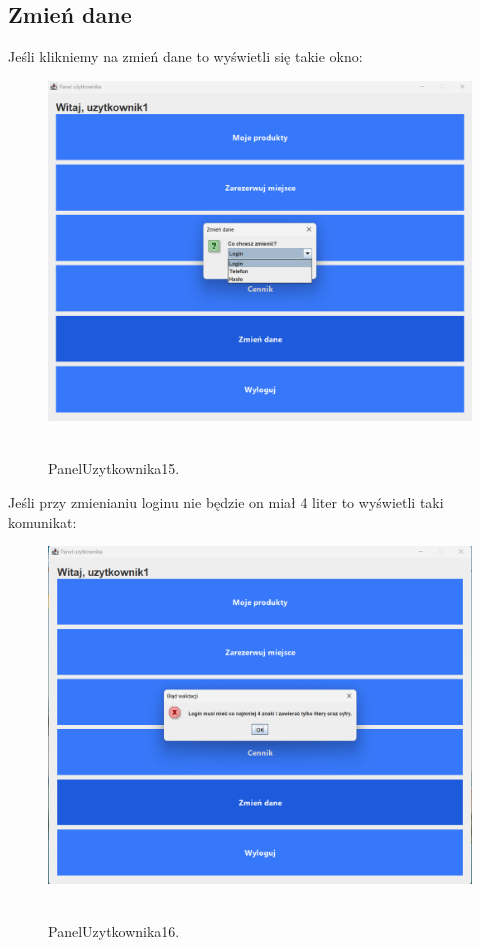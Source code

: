\subsection{Zmień dane}
\label{subsec:Zmień dane}

Jeśli klikniemy na zmień dane to wyświetli się takie okno:

\begin{figure}[H]
    \centering
    \includegraphics[width=.9\linewidth]{figures/PanelUzytkownika15.png}\
    \caption{PanelUzytkownika15.\label{PanelUzytkownika15}}
\end{figure}

Jeśli przy zmienianiu loginu nie będzie on miał 4 liter to wyświetli taki komunikat:

\begin{figure}[H]
    \centering
    \includegraphics[width=.9\linewidth]{figures/PanelUzytkownika16.png}\
    \caption{PanelUzytkownika16.\label{PanelUzytkownika16}}
\end{figure}

